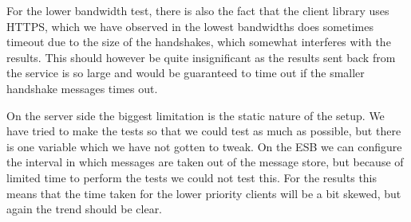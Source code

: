 	For the lower bandwidth test, there is also the fact that the client library uses HTTPS, which we have observed in the lowest bandwidths does sometimes timeout due to the size of the handshakes, which somewhat interferes with the results. This should however be quite insignificant as the results sent back from the service is so large and would be guaranteed to time out if the smaller handshake messages times out.
	
	On the server side the biggest limitation is the static nature of the setup. We have tried to make the tests so that we could test as much as possible, but there is one variable which we have not gotten to tweak. On the ESB we can configure the interval in which messages are taken out of the message store, but because of limited time to perform the tests we could not test this. For the results this means that the time taken for the lower priority clients will be a bit skewed, but again the trend should be clear.
